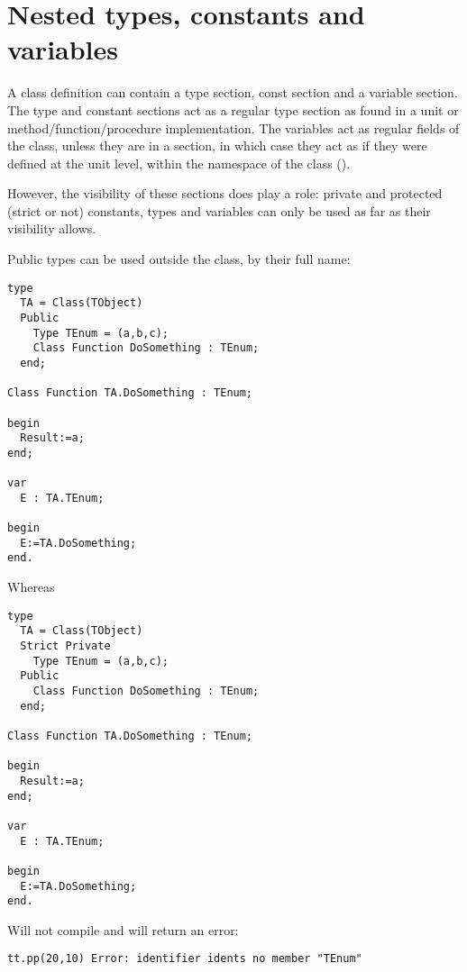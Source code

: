 
\section{Nested types, constants and variables}
A class definition can contain a type section, const section and a variable section.
The type and constant sections act as a regular type section as found in a unit or
method/function/procedure implementation. The variables act as regular fields of the
class, unless they are in a  section, in which case they act as if they
were defined at the unit level, within the namespace of the class ().

However, the visibility of these sections does play a role: private and protected
(strict or not) constants, types and variables can only be used as far as their
visibility allows.

Public types can be used outside the class, by their full name:
\begin{verbatim}
type
  TA = Class(TObject)
  Public
    Type TEnum = (a,b,c);
    Class Function DoSomething : TEnum;
  end;

Class Function TA.DoSomething : TEnum;

begin
  Result:=a;
end;

var
  E : TA.TEnum;

begin
  E:=TA.DoSomething;
end.
\end{verbatim}
Whereas
\begin{verbatim}
type
  TA = Class(TObject)
  Strict Private
    Type TEnum = (a,b,c);
  Public
    Class Function DoSomething : TEnum;
  end;

Class Function TA.DoSomething : TEnum;

begin
  Result:=a;
end;

var
  E : TA.TEnum;

begin
  E:=TA.DoSomething;
end.
\end{verbatim}
Will not compile and will return an error:
\begin{verbatim}
tt.pp(20,10) Error: identifier idents no member "TEnum"
\end{verbatim}

